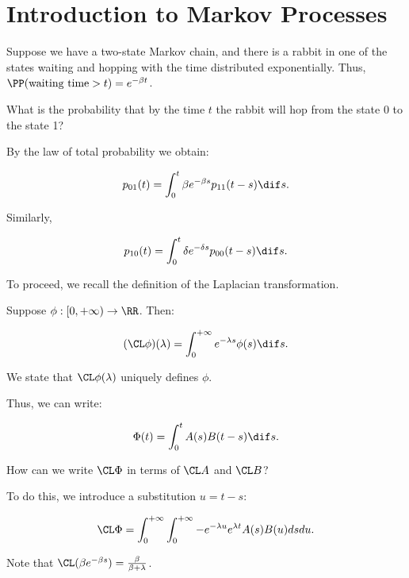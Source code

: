 \documentclass[11pt]{scrartcl}
\begin{document}
  \section{Introduction to Markov Processes}

  Suppose we have a two-state Markov chain, and there is a rabbit in
  one of the states waiting and hopping with the time distributed
  exponentially. Thus, $\PP(\text{waiting time} > t) = e^{-\beta t}$.

  What is the probability that by the time $t$ the rabbit will hop
  from the state 0 to the state 1?

  By the law of total probability we obtain:
  
  \begin{equation*}
    p_{01}(t) = \int_{0}^{t}\beta e^{-\beta s}p_{11}(t-s)\dif s.
  \end{equation*}

  Similarly,
  
  \begin{equation*}
    p_{10}(t) = \int_{0}^{t}\delta e^{-\delta s}p_{00}(t-s)\dif s.
  \end{equation*}

  To proceed, we recall the definition of the Laplacian
  transformation.

  Suppose $\phi: [0, +\infty) \to \RR$. Then:

  \begin{equation*}
    (\CL\phi)(\lambda) = \int_{0}^{+\infty}e^{-\lambda s}\phi(s) \dif s.
  \end{equation*}

  We state that $\CL \phi(\lambda)$ uniquely defines $\phi$.

  Thus, we can write:

  
  \begin{equation*}
    \Phi(t) = \int_{0}^{t}A(s)B(t-s) \dif s.
  \end{equation*}

  How can we write $\CL\Phi$ in terms of $\CL A$ and $\CL B$?

  To do this, we introduce a substitution $u = t - s$:

  
  \begin{equation*}
    \CL \Phi = \int_{0}^{+\infty}\int_{0}^{+\infty}-e^{-\lambda u}e^{\lambda t}A(s)B(u)ds du.
  \end{equation*}

  Note that $\CL(\beta e^{-\beta s}) = \frac{\beta}{\beta+\lambda}$.
\end{document}
